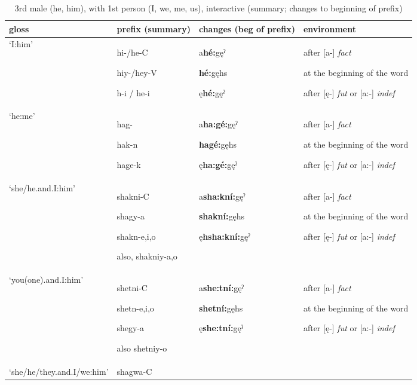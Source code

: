 \begin{table}
\caption{3rd male (he, him), with 1st person (I, we, me, us), interactive (summary; changes to beginning of prefix)}
\label{tab:1:3m1pron}
\tiny{
\begin{tabularx}{\textwidth}{XXXX}
\lsptoprule
gloss & prefix (summary) & changes (beg of prefix) & environment\\
\midrule
‘I:him’ & hi-/he-C

hiy-/hey-V

h-i / he-i & a\textbf{hé:}gęˀ

\textbf{hé:}gęhs

ę\textbf{hé:}gęˀ & after [a-] \textit{fact}

at the beginning of the word 

after [ę-] \textit{fut} or [a:-] \textit{indef}\\
‘he:me’ & hag-

hak-n

hage-k & a\textbf{ha:gé:}gęˀ

\textbf{hagé:}gęhs

ę\textbf{ha:gé:}gęˀ & after [a-] \textit{fact}

at the beginning of the word 

after [ę-] \textit{fut} or [a:-] \textit{indef}\\
‘she/he.and.I:him’ & shakni-C

shagy-a 

shakn-e,i,o

also, shakniy-a,o & a\textbf{sha:kní:}gęˀ

\textbf{shakní:}gęhs

ę\textbf{hsha:kní:}gęˀ & after [a-] \textit{fact}

at the beginning of the word 

after [ę-] \textit{fut} or [a:-] \textit{indef}\\
‘you(one).and.I:him’ & shetni-C

shetn-e,i,o

shegy-a

also shetniy-o & a\textbf{she:tní:}gęˀ

\textbf{shetní:}gęhs

ę\textbf{she:tní:}gęˀ & after [a-] \textit{fact}

at the beginning of the word 

after [ę-] \textit{fut} or [a:-] \textit{indef}\\
‘she/he/they.and.I/we:him’ & shagwa-C


\end{tabularx}}
\end{table}
